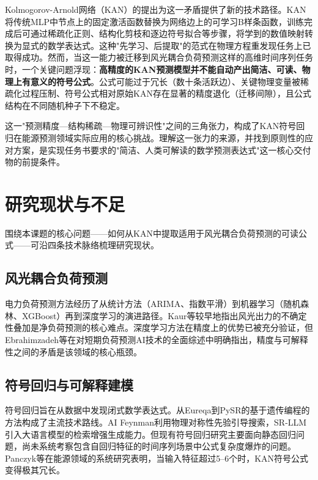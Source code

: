 \documentclass[12pt,a4paper,oneside]{ctexbook}
\begin{document}
Kolmogorov-Arnold网络（KAN）的提出为这一矛盾提供了新的技术路径\cite{liu2025kan}。KAN将传统MLP中节点上的固定激活函数替换为网络边上的可学习B样条函数，训练完成后可通过稀疏化正则、结构化剪枝和逐边符号拟合等步骤，将学到的数值映射转换为显式的数学表达式\cite{liu2025kan,liu2025kan2}。这种"先学习、后提取"的范式在物理方程重发现任务上已取得成功。然而，当这一能力被迁移到风光耦合负荷预测这样的高维时间序列任务时，一个关键问题浮现：\textbf{高精度的KAN预测模型并不能自动产出简洁、可读、物理上有意义的符号公式}。公式可能过于冗长（数十条活跃边）、关键物理变量被稀疏化过程压制、符号公式相对原始KAN存在显著的精度退化（迁移间隙），且公式结构在不同随机种子下不稳定。

这一"预测精度—结构稀疏—物理可辨识性"之间的三角张力，构成了KAN符号回归在能源预测领域实际应用的核心挑战。理解这一张力的来源，并找到原则性的应对方案，是实现任务书要求的"简洁、人类可解读的数学预测表达式"这一核心交付物的前提条件。

\section{研究现状与不足}

围绕本课题的核心问题——如何从KAN中提取适用于风光耦合负荷预测的可读公式——可沿四条技术脉络梳理研究现状。

\subsection{风光耦合负荷预测}

电力负荷预测方法经历了从统计方法（ARIMA、指数平滑）到机器学习（随机森林、XGBoost）再到深度学习的演进路径\cite{hong2016probabilistic,ebrahimzadeh2024ai}。Kaur等\cite{kaur2016net}较早地指出风光出力的不确定性叠加是净负荷预测的核心难点。深度学习方法在精度上的优势已被充分验证\cite{silva2024lstm,wang2023hybrid}，但Ebrahimzadeh等\cite{ebrahimzadeh2024ai}在对短期负荷预测AI技术的全面综述中明确指出，精度与可解释性之间的矛盾是该领域的核心瓶颈。

\subsection{符号回归与可解释建模}

符号回归旨在从数据中发现闭式数学表达式。从Eureqa\cite{schmidt2009distilling}到PySR\cite{cranmer2023pysr}的基于遗传编程的方法构成了主流技术路线。AI Feynman\cite{udrescu2020ai}利用物理对称性先验引导搜索，SR-LLM\cite{shojaee2025sr}引入大语言模型的检索增强生成能力。但现有符号回归研究主要面向静态回归问题，尚未系统考察包含自回归特征的时间序列场景中公式复杂度爆炸的问题。Panczyk等\cite{panczyk2025opening}在能源领域的系统研究表明，当输入特征超过5--6个时，KAN符号公式变得极其冗长。
\end{document}
